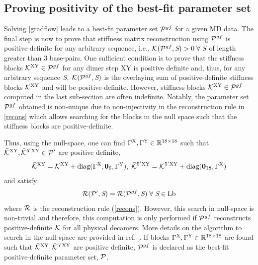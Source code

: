 \subsection{Proving positivity of the best-fit parameter set}\label{c2:s4:sb6}
Solving \cref{gradflow} leads to a best-fit parameter set ${\mathcal P}^{gf}$ for a given MD data. 
The final step is now to prove that stiffness matrix reconstruction using ${\mathcal P}^{gf}$ is positive-definite for any arbitrary sequence, i.e., ${\mathcal K}({\mathcal P}^{gf},{\textit{S}}) > 0 \; \forall \; {\textit{S}}$ of length greater than 3 base-pairs.
One sufficient condition is to prove that the stiffness blocks ${\mathcal K}^{{\text{XY}}} \in {\mathcal P}^{gf}$ for any dimer step XY is positive definite and, thus, for any arbitrary sequence ${\textit{S}}, \; {\mathcal K}({\mathcal P}^{gf},{\textit{S}})$ is the overlaying sum of positive-definite stiffness blocks ${\mathcal K}^{{\text{XY}}}$ and will be positive-definite. 
However, stiffness blocks ${\mathcal K}^{{\text{XY}}} \in {\mathcal P}^{gf}$ computed in the last sub-section are often indefinite. 
Notably, the parameter set ${\mathcal P}^{gf}$ obtained is non-unique due to non-injectivity in the reconstruction rule in \cref{recons} which allows searching for the blocks in the null space such that the stiffness blocks are positive-definite.

Thus, using the null-space, one can find $\Gamma^{\text{X}}, \Gamma^{\text{Y}}\in {\mathbb R}^{18\times18}$ such that $\bar{{\mathcal K}}^{{\text{XY}}}, \bar{{\mathcal K}}^{5^\prime{\text{XY}}} \in {\mathcal P}'$ are positive definite, 
\begin{equation}
\bar{{\mathcal K}}^{{\text{XY}}} = {\mathcal K}^{{\text{XY}}} + \text{diag}(\Gamma^{\text{X}},\bold{0}_6,\Gamma^{\text{Y}}), \; 
\bar{{\mathcal K}}^{5^\prime{\text{XY}}} = {\mathcal K}^{5^\prime{\text{XY}}} + \text{diag}(\bold{0}_{18},\Gamma^{\text{X}})
\label{nullspace}    
\end{equation}
and satisfy
\begin{equation}
{\mathcal R}({\mathcal P}',{\textit{S}}) = {\mathcal R}({\mathcal P}^{gf},{\textit{S}}) \; \forall \; {\textit{S}} \in {\text{Lb}} 
\label{nullspace2}    
\end{equation}
where ${\mathcal R}$ is the reconstruction rule (\cref{recons}). 
However, this search in null-space is non-trivial and therefore, this computation is only performed if ${\mathcal P}^{gf}$ reconstructs positive-definite ${\mathcal K}$ for all physical decamers. 
More details on the algorithm to search in the null-space are provided in ref.~\cite{patelithesis}. 
If blocks $\Gamma^{\text{X}}, \Gamma^{\text{Y}}\in {\mathbb R}^{18\times18}$ are found such that $\bar{{\mathcal K}}^{{\text{XY}}}, \bar{{\mathcal K}}^{5^\prime{\text{XY}}}$ are positive definite, ${\mathcal P}^{gf}$ is declared as the best-fit positive-definite parameter set, ${\mathcal P}$. 


